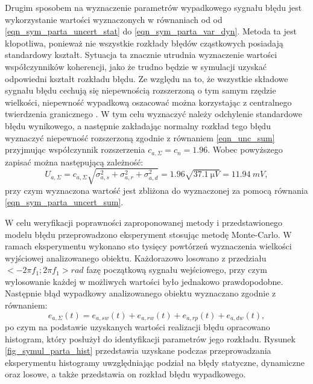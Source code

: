 Drugim sposobem na wyznaczenie parametrów wypadkowego sygnału błędu jest wykorzystanie wartości wyznaczonych w równaniach od od \eqref{eqn_sym_parta_uncert_stat} do \eqref{eqn_sym_parta_var_dyn}. Metoda ta jest kłopotliwa, ponieważ nie wszystkie rozkłady błędów cząstkowych posiadają standardowy kształt. Sytuacja ta znacznie utrudnia wyznaczenie wartości współczynników koherencji, jako że trudno będzie w symulacji uzyskać odpowiedni kształt rozkładu błędu. Ze względu na to, że wszystkie składowe sygnału błędu cechują się niepewnością rozszerzoną o tym samym rzędzie wielkości, niepewność wypadkową oszacować można korzystając z centralnego twierdzenia granicznego \cite{jcgm_guide}. W tym celu wyznaczyć należy odchylenie standardowe błędu wynikowego, a następnie zakładając normalny rozkład tego błędu wyznaczyć niepewność rozszerzoną zgodnie z równaniem \eqref{eqn_unc_sum} przyjmując współczynnik rozszerzenia $c_{a,\Sigma} = c_{n} = 1.96$. Wobec powyższego zapisać można następującą zależność:
\begin{equation}
U_{a,\Sigma} = c_{a,\Sigma} \sqrt{\sigma_{a,s}^{2} + \sigma_{a,r}^{2} + \sigma_{a,d}^{2}} = 1.96 \sqrt{\qty{37.1}{\micro V}} = \qty{11.94}{mV} \label{eqn_sym_parta_uncert_value_b},
\end{equation}
przy czym wyznaczona wartość jest zbliżona do wyznaczonej za pomocą równania \eqref{eqn_sym_parta_uncert_sum}.

W celu weryfikacji poprawności zaproponowanej metody i przedstawionego modelu błędu przeprowadzono eksperyment stosując metodę Monte-Carlo. W ramach eksperymentu wykonano sto tysięcy powtórzeń wyznaczenia wielkości wyjściowej analizowanego obiektu. Każdorazowo losowano z przedziału $<-2 \pi f_{1};2 \pi f_{1}>\unit{rad}$ fazę początkową sygnału wejściowego, przy czym wylosowanie każdej w możliwych wartości było jednakowo prawdopodobne. Następnie błąd wypadkowy analizowanego obiektu wyznaczano zgodnie z równaniem:
\begin{equation}
e_{a,\Sigma}(t) = e_{a,sw}(t) + e_{a,rw}(t) + e_{a,rp}(t) + e_{a,dw}(t) \label{eqn_sym_parta_error_sum},
\end{equation}
po czym na podstawie uzyskanych wartości realizacji błędu opracowano histogram, który posłużył do identyfikacji parametrów jego rozkładu. Rysunek \ref{fig_symul_parta_hist} przedstawia uzyskane podczas przeprowadzania eksperymentu histogramy uwzględniając podział na błędy statyczne, dynamiczne oraz losowe, a także przedstawia on rozkład błędu wypadkowego.

